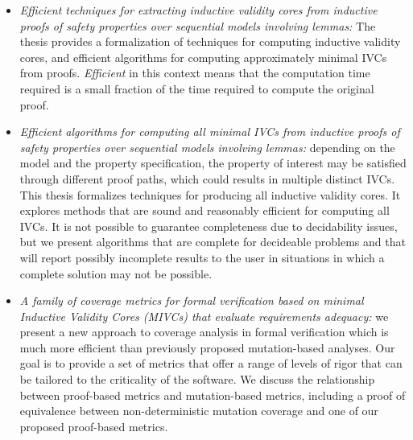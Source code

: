 \begin{itemize}
    \item \emph{Efficient techniques for extracting inductive validity cores from inductive proofs of safety properties over sequential models involving lemmas:} The thesis provides a formalization of techniques for computing inductive validity cores, and efficient algorithms for computing approximately minimal IVCs from proofs.  {\em Efficient} in this context means that the computation time required is a small fraction of the time required to compute the original proof.
    \item \emph{Efficient algorithms for computing all minimal IVCs from inductive proofs of safety properties over sequential models involving lemmas:} depending on the model and the property specification, the property of interest may be satisfied through different proof paths, which could results in multiple distinct IVCs. This thesis formalizes techniques for producing all inductive validity cores.  It explores methods that are sound and reasonably efficient for computing all IVCs.  It is not possible to guarantee completeness due to decidability issues, but we present algorithms that are complete for decideable problems and that will report possibly incomplete results to the user in situations in which a complete solution may not be possible.
   \item \emph{A family of coverage metrics for formal verification based on \emph{minimal} Inductive Validity Cores (MIVCs) that evaluate requirements adequacy:} we present a new approach to coverage analysis in formal verification which is much more efficient than previously proposed mutation-based analyses. Our goal is to provide a set of metrics that offer a range of levels of rigor that can be tailored to the criticality of the software. We discuss the relationship between proof-based metrics and mutation-based metrics, including a proof of equivalence between non-deterministic mutation coverage and one of our proposed proof-based metrics.

\end{itemize}
